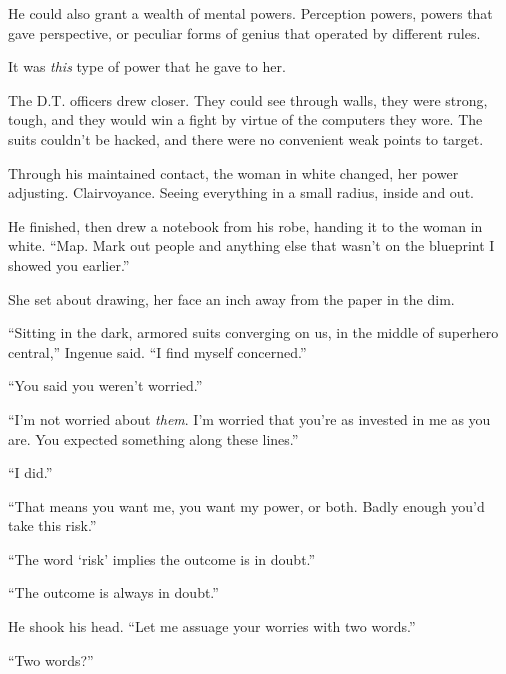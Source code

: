 He could also grant a wealth of mental powers.  Perception powers, powers that gave perspective, or peculiar forms of genius that operated by different rules.



It was \emph{this} type of power that he gave to her.



The D.T. officers drew closer.  They could see through walls, they were strong, tough, and they would win a fight by virtue of the computers they wore.  The suits couldn't be hacked, and there were no convenient weak points to target.



Through his maintained contact, the woman in white changed, her power adjusting.  Clairvoyance.  Seeing everything in a small radius, inside and out.



He finished, then drew a notebook from his robe, handing it to the woman in white.  ``Map.  Mark out people and anything else that wasn't on the blueprint I showed you earlier.''



She set about drawing, her face an inch away from the paper in the dim.



``Sitting in the dark, armored suits converging on us, in the middle of superhero central,'' Ingenue said.  ``I find myself concerned.''



``You said you weren't worried.''



``I'm not worried about \emph{them}.  I'm worried that you're as invested in me as you are.  You expected something along these lines.''



``I did.''



``That means you want me, you want my power, or both.  Badly enough you'd take this risk.''



``The word `risk' implies the outcome is in doubt.''



``The outcome is always in doubt.''



He shook his head.  ``Let me assuage your worries with two words.''



``Two words?''



